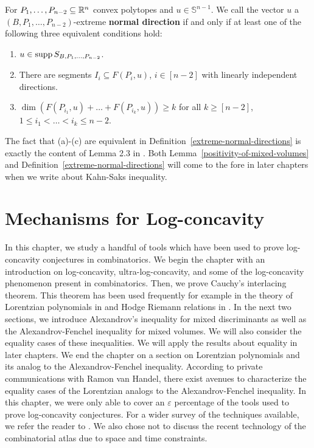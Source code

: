 \documentclass{puthesis-UG}
\begin{document}
\begin{defn} \label{extreme-normal-directions}
	For $P_1, \ldots, P_{n-2} \subseteq \mathbb{R}^n$ convex polytopes and $u \in \mathbb{S}^{n-1}$. We call the vector $u$ a $(B, P_1, \ldots, P_{n-2})$-extreme \textbf{normal direction} if and only if at least one of the following three equivalent conditions hold:
	\begin{enumerate}[label = (\alph*)]
		\item $u \in \operatorname{supp} S_{B, P_1, \ldots, P_{n-2}}$. 
		\item There are segments $I_i \subseteq F (P_i, u)$, $i \in [n-2]$ with linearly independent directions. 
		\item $\dim(F(P_{i_1}, u) + \ldots + F(P_{i_k}, u)) \geq k$ for all $k \geq [n-2]$, $1 \leq i_1 < \ldots < i_k \leq n-2$. 
	\end{enumerate}
\end{defn}

The fact that (a)-(c) are equivalent in Definition~\ref{extreme-normal-directions} is exactly the content of Lemma 2.3 in \cite{shenfeld2022extremals}. Both Lemma~\ref{positivity-of-mixed-volumes} and Definition~\ref{extreme-normal-directions} will come to the fore in later chapters when we write about Kahn-Saks inequality.  

\chapter{Mechanisms for Log-concavity}
In this chapter, we study a handful of tools which have been used to prove log-concavity conjectures in combinatorics. We begin the chapter with an introduction on log-concavity, ultra-log-concavity, and some of the log-concavity phenomenon present in combinatorics. Then, we prove Cauchy's interlacing theorem. This theorem has been used frequently for example in the theory of Lorentzian polynomials in \cite{lorentzian-polynomials} and Hodge Riemann relations in \cite{MN-gorenstein}. In the next two sections, we introduce Alexandrov's inequality for mixed discriminants as well as the Alexandrov-Fenchel inequality for mixed volumes. We will also consider the equality cases of these inequalities. We will apply the results about equality in later chapters. We end the chapter on a section on Lorentzian polynomials and its analog to the Alexandrov-Fenchel inequality. According to private communications with Ramon van Handel, there exist avenues to characterize the equality cases of the Lorentzian analogs to the Alexandrov-Fenchel inequality. In this chapter, we were only able to cover an $\varepsilon$ percentage of the tools used to prove log-concavity conjectures. For a wider survey of the techniques available, we refer the reader to \cite{Stanley1989LogConcaveAU}. We also chose not to discuss the recent technology of the combinatorial atlas \cite{combinatorial-atlas,logconcave-poset-inequalities} due to space and time constraints. 
\end{document}
